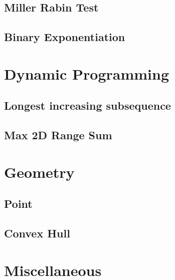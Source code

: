 \subsection{Miller Rabin Test}
\raggedbottom
\hrulefill
\subsection{Binary Exponentiation}
\raggedbottom
\hrulefill

\section{Dynamic Programming}
\subsection{Longest increasing subsequence}
\raggedbottom
\hrulefill
\subsection{Max 2D Range Sum}
\raggedbottom
\hrulefill

\section{Geometry}
\subsection{Point}
\raggedbottom
\hrulefill
\subsection{Convex Hull}
\raggedbottom
\hrulefill

\section{Miscellaneous}

